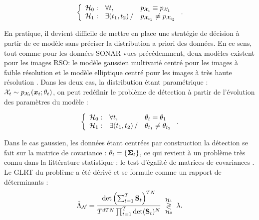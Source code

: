 \begin{equation}
  \left\{ \begin{array}{lll} \mathcal{H}_0: &  \forall t, & p_{\mathcal{X}_t} \equiv p_{\mathcal{X}_1}   \\ 
  \mathcal{H}_1: & \exists (t_1, t_2)\, / & p_{\mathcal{X}_{t_1}} \not\equiv  p_{\mathcal{X}_{t_2}}  \end{array}\right. .
\end{equation}

En pratique, il devient difficile de mettre en place une stratégie de décision à partir de ce modèle sans préciser la distribution a priori des données. En ce sens, tout comme pour les données SONAR vues précédemment, deux modèles existent pour les images RSO: le modèle gaussien multivarié centré pour les images à faible résolution \cite{lee2017polarimetric} et le modèle elliptique centré pour les images à très haute résolution \cite{413444, greco2007statistical}. Dans les deux cas, la distribution étant paramétrique : $\mathcal{X}_t \sim p_{\mathcal{X}_t}(\boldsymbol{x}_t;\theta_t)$, on peut redéfinir le problème de détection à partir de l'évolution des paramètres du modèle :

\begin{equation}
  \left\{ \begin{array}{lll} \mathcal{H}_0: &  \forall t, & \theta_t = \theta_1   \\ 
  \mathcal{H}_1: & \exists (t_1, t_2)\, / & \theta_{t_1} \neq \theta_{t_2} \end{array}\right. .
\end{equation}

Dans le cas gaussien, les données étant centrées par construction la détection se fait sur la matrice de covariance : $\theta_t = \{\boldsymbol{\Sigma}_t\}$, ce qui revient à un problème très connu dans la littérature statistique : le test d'égalité de matrices de covariances \cite{anderson1958introduction}. Le GLRT du problème a été dérivé et se formule comme un rapport de déterminants :
\begin{equation}
  \hat{\Lambda}_{\mathcal{N}} = \dfrac{\operatorname{\operatorname{det}}\left(\sum_{t=1}^{T} \mathbf{S}_t\right)^{TN}}{T^{dTN}\prod_{t=1}^{T} \operatorname{\operatorname{det}}(\mathbf{S}_t)^{N}} \;\underset{\mathcal{H}_0}{\overset{\mathcal{H}_1}{\gtrless}}\; \lambda .
  \label{eq:glrt_gaussian_cd}
\end{equation}


